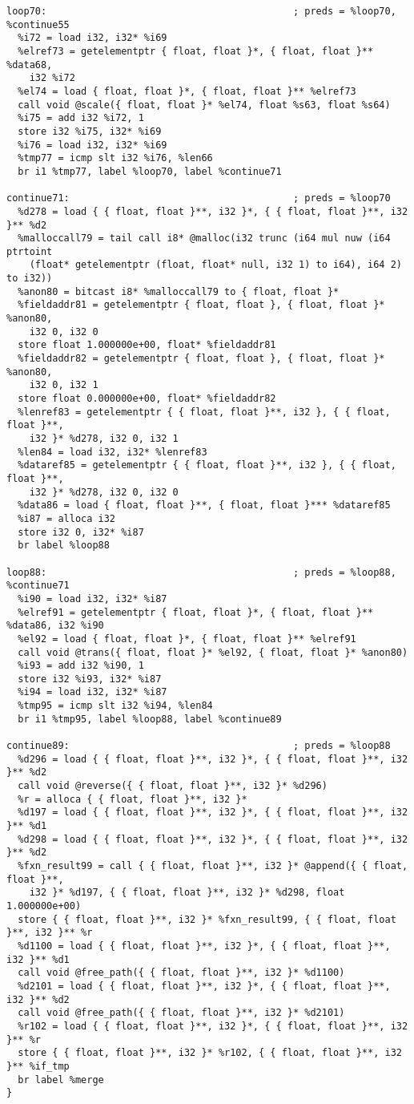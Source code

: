 \documentclass[main.tex]{subfiles}
\begin{document}
{\begin{lstlisting}
loop70:                                           ; preds = %loop70, %continue55
  %i72 = load i32, i32* %i69
  %elref73 = getelementptr { float, float }*, { float, float }** %data68,
    i32 %i72
  %el74 = load { float, float }*, { float, float }** %elref73
  call void @scale({ float, float }* %el74, float %s63, float %s64)
  %i75 = add i32 %i72, 1
  store i32 %i75, i32* %i69
  %i76 = load i32, i32* %i69
  %tmp77 = icmp slt i32 %i76, %len66
  br i1 %tmp77, label %loop70, label %continue71

continue71:                                       ; preds = %loop70
  %d278 = load { { float, float }**, i32 }*, { { float, float }**, i32 }** %d2
  %malloccall79 = tail call i8* @malloc(i32 trunc (i64 mul nuw (i64 ptrtoint
    (float* getelementptr (float, float* null, i32 1) to i64), i64 2) to i32))
  %anon80 = bitcast i8* %malloccall79 to { float, float }*
  %fieldaddr81 = getelementptr { float, float }, { float, float }* %anon80,
    i32 0, i32 0
  store float 1.000000e+00, float* %fieldaddr81
  %fieldaddr82 = getelementptr { float, float }, { float, float }* %anon80,
    i32 0, i32 1
  store float 0.000000e+00, float* %fieldaddr82
  %lenref83 = getelementptr { { float, float }**, i32 }, { { float, float }**,
    i32 }* %d278, i32 0, i32 1
  %len84 = load i32, i32* %lenref83
  %dataref85 = getelementptr { { float, float }**, i32 }, { { float, float }**,
    i32 }* %d278, i32 0, i32 0
  %data86 = load { float, float }**, { float, float }*** %dataref85
  %i87 = alloca i32
  store i32 0, i32* %i87
  br label %loop88

loop88:                                           ; preds = %loop88, %continue71
  %i90 = load i32, i32* %i87
  %elref91 = getelementptr { float, float }*, { float, float }** %data86, i32 %i90
  %el92 = load { float, float }*, { float, float }** %elref91
  call void @trans({ float, float }* %el92, { float, float }* %anon80)
  %i93 = add i32 %i90, 1
  store i32 %i93, i32* %i87
  %i94 = load i32, i32* %i87
  %tmp95 = icmp slt i32 %i94, %len84
  br i1 %tmp95, label %loop88, label %continue89

continue89:                                       ; preds = %loop88
  %d296 = load { { float, float }**, i32 }*, { { float, float }**, i32 }** %d2
  call void @reverse({ { float, float }**, i32 }* %d296)
  %r = alloca { { float, float }**, i32 }*
  %d197 = load { { float, float }**, i32 }*, { { float, float }**, i32 }** %d1
  %d298 = load { { float, float }**, i32 }*, { { float, float }**, i32 }** %d2
  %fxn_result99 = call { { float, float }**, i32 }* @append({ { float, float }**,
    i32 }* %d197, { { float, float }**, i32 }* %d298, float 1.000000e+00)
  store { { float, float }**, i32 }* %fxn_result99, { { float, float }**, i32 }** %r
  %d1100 = load { { float, float }**, i32 }*, { { float, float }**, i32 }** %d1
  call void @free_path({ { float, float }**, i32 }* %d1100)
  %d2101 = load { { float, float }**, i32 }*, { { float, float }**, i32 }** %d2
  call void @free_path({ { float, float }**, i32 }* %d2101)
  %r102 = load { { float, float }**, i32 }*, { { float, float }**, i32 }** %r
  store { { float, float }**, i32 }* %r102, { { float, float }**, i32 }** %if_tmp
  br label %merge
}


\end{lstlisting}}
\end{document}
